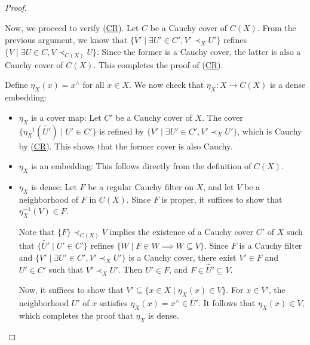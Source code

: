 \documentclass[reqno]{amsart}
\newcommand{\axref}[1]{(\hyperref[ax:#1]{#1})}
\theoremstyle{definition}
\theoremstyle{remark}
\numberwithin{figure}{section}
\newcommand{\rb}{\prec}
\begin{document}
\begin{proof}
\begin{itemize}
        Now, we proceed to verify \axref{CR}.
        Let $C$ be a Cauchy cover of $C(X)$.
        From the previous argument, we know that $\{ \widetilde{V'} \mid \exists U' \in C', V' \rb_X U' \}$ refines $\{ V \mid \exists U \in C, V \rb_{C(X)} U \}$.
        Since the former is a Cauchy cover, the latter is also a Cauchy cover of $C(X)$.
        This completes the proof of \axref{CR}.
\end{itemize}

Define $\eta_X(x) = x^\wedge$ for all $x \in X$.
We now check that $\eta_X : X \to C(X)$ is a dense embedding:
\begin{itemize}
\item $\eta_X$ is a cover map: Let $C'$ be a Cauchy cover of $X$.
The cover $\{ \eta_X^{-1}(\widetilde{U'}) \mid U' \in C' \}$ is refined by $\{ V' \mid \exists U' \in C', V' \rb_X U' \}$, which is Cauchy by \axref{CR}.
This shows that the former cover is also Cauchy.
\item $\eta_X$ is an embedding: This follows directly from the definition of $C(X)$.
\item $\eta_X$ is dense:
        Let $F$ be a regular Cauchy filter on $X$, and let $V$ be a neighborhood of $F$ in $C(X)$.
        Since $F$ is proper, it suffices to show that $\eta_X^{-1}(V) \in F$.

        Note that $\{ F \} \rb_{C(X)} V$ implies the existence of a Cauchy cover $C'$ of $X$ such that $\{ \widetilde{U'} \mid U' \in C' \}$ refines $\{ W \mid F \in W \implies W \subseteq V \}$.
        Since $F$ is a Cauchy filter and $\{ V' \mid \exists U' \in C', V' \rb_X U' \}$ is a Cauchy cover, there exist $V' \in F$ and $U' \in C'$ such that $V' \rb_X U'$.
        Then $U' \in F$, and $F \in \widetilde{U'} \subseteq V$.

        Now, it suffices to show that $V' \subseteq \{ x \in X \mid \eta_X(x) \in V \}$.
        For $x \in V'$, the neighborhood $U'$ of $x$ satisfies $\eta_X(x) = x^\wedge \in \widetilde{U'}$.
        It follows that $\eta_X(x) \in V$, which completes the proof that $\eta_X$ is dense.
\end{itemize}


\end{proof}
\end{document}

